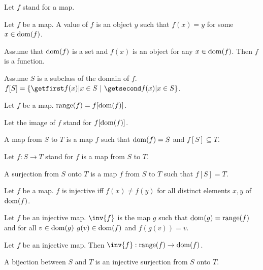 \documentclass{article}
\begin{document}
\begin{forthel}
  Let $f$ stand for a map.

\begin{definition}
Let $f$ be a map. A value of $f$ is an object $y$ such
that $f(x) = y$ for some $x \in \operatorname{dom}(f)$.
\end{definition}


  \begin{axiom}
    Assume that $\operatorname{dom}(f)$ is a set and $f(x)$ is an object for any
    $x \in \operatorname{dom}(f)$.
    Then $f$ is a function.
  \end{axiom}

  \begin{definition}
    Assume $S$ is a subclass of the domain of $f$.
    $f[S] = \class{f(x) | x \in S}$.
  \end{definition}

\begin{definition}
Let $f$ be a map. $\operatorname{range}(f) = f[\operatorname{dom}(f)]$.
\end{definition}


  Let the image of $f$ stand for $f[\operatorname{dom}(f)]$.

\begin{definition}
    A map from $S$ to $T$ is a map $f$ such that $\operatorname{dom}(f) = S$ and $f[S]
    \subseteq T$.
  \end{definition}

Let $f : S \rightarrow T$ stand for $f$ is a map from $S$ to $T$.

\begin{definition}
A surjection from $S$
onto $T$ is a map $f$ from $S$ to $T$ such that $f[S] = T$.
\end{definition}

\begin{definition}
Let $f$ be a map. $f$ is injective iff $f(x) \neq f(y)$ for all
distinct elements $x,y$ of $\operatorname{dom}(f)$.
\end{definition}

\begin{signature}
Let $f$ be an injective map.
$\inv{f}$ is the map $g$ such that $\operatorname{dom}(g) = \operatorname{range}(f)$
and for all $v \in \operatorname{dom}(g)$ $g(v) \in \operatorname{dom}(f)$ and $f(g(v))=v$.
\end{signature}

\begin{lemma}
Let $f$ be an injective map. Then 
$\inv{f} : \range(f) \rightarrow \dom(f)$.
\end{lemma}


\begin{definition}
A bijection between $S$ and $T$ is an injective surjection from
$S$ onto $T$.
\end{definition}


\end{forthel}
\end{document}
